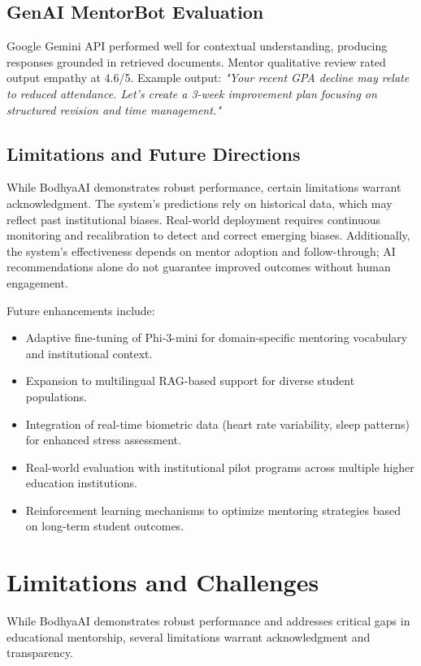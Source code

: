 \documentclass[conference]{IEEEtran}
\begin{document}
\subsection{GenAI MentorBot Evaluation}
Google Gemini API performed well for contextual understanding, producing responses grounded in retrieved documents. Mentor qualitative review rated output empathy at 4.6/5. Example output:
\textit{"Your recent GPA decline may relate to reduced attendance. Let's create a 3-week improvement plan focusing on structured revision and time management."}

\subsection{Limitations and Future Directions}
While BodhyaAI demonstrates robust performance, certain limitations warrant acknowledgment. The system's predictions rely on historical data, which may reflect past institutional biases. Real-world deployment requires continuous monitoring and recalibration to detect and correct emerging biases. Additionally, the system's effectiveness depends on mentor adoption and follow-through; AI recommendations alone do not guarantee improved outcomes without human engagement.

Future enhancements include:
\begin{itemize}
    \item Adaptive fine-tuning of Phi-3-mini for domain-specific mentoring vocabulary and institutional context.
    \item Expansion to multilingual RAG-based support for diverse student populations.
    \item Integration of real-time biometric data (heart rate variability, sleep patterns) for enhanced stress assessment.
    \item Real-world evaluation with institutional pilot programs across multiple higher education institutions.
    \item Reinforcement learning mechanisms to optimize mentoring strategies based on long-term student outcomes.
\end{itemize}

\section{Limitations and Challenges}

While BodhyaAI demonstrates robust performance and addresses critical gaps in educational mentorship, several limitations warrant acknowledgment and transparency.
\end{document}
